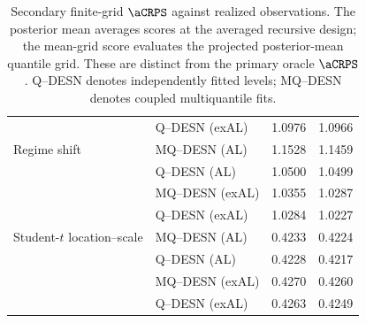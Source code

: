 \begin{table}[p]
\begin{tabular}{@{}>{\raggedright\arraybackslash}p{}>{\raggedright\arraybackslash}p{}rr@{}}
 & Q--DESN (exAL) & 1.0976 & 1.0966 \\
\addlinespace[2pt]
Regime shift & MQ--DESN (AL) & 1.1528 & 1.1459 \\
 & Q--DESN (AL) & 1.0500 & 1.0499 \\
 & MQ--DESN (exAL) & 1.0355 & 1.0287 \\
 & Q--DESN (exAL) & 1.0284 & 1.0227 \\
\addlinespace[2pt]
Student-\(t\) location--scale & MQ--DESN (AL) & 0.4233 & 0.4224 \\
 & Q--DESN (AL) & 0.4228 & 0.4217 \\
 & MQ--DESN (exAL) & 0.4270 & 0.4260 \\
 & Q--DESN (exAL) & 0.4263 & 0.4249 \\
\bottomrule
\end{tabular}
\caption{Secondary finite-grid \(\aCRPS\) against realized observations. The posterior mean averages scores at the averaged recursive design; the mean-grid score evaluates the projected posterior-mean quantile grid. These are distinct from the primary oracle \(\aCRPS\). Q--DESN denotes independently fitted levels; MQ--DESN denotes coupled multiquantile fits.}
\label{tab:joint-qdesn-pure-desn-v2-secondary}
\end{table}

